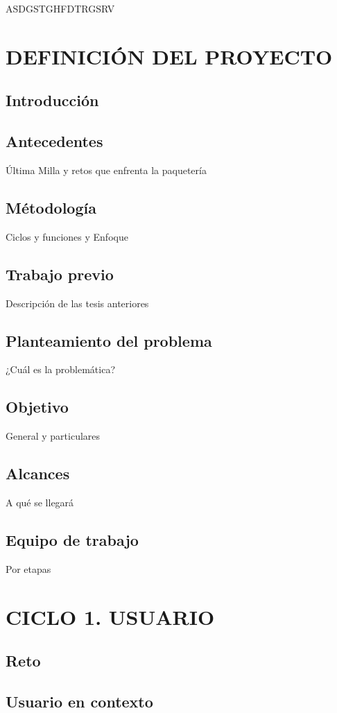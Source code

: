 \documentclass[12pt,letterpaper]{book}
\begin{document}
ASDGSTGHFDTRGSRV
\newpage

\renewcommand{\contentsname}{TABLA DE CONTENIDO}
\tableofcontents
\thispagestyle{empty}
\newpage

\setcounter{page}{1}
\chapter{DEFINICIÓN DEL PROYECTO}
\section{Introducción}
\section{Antecedentes}
Última Milla y retos que enfrenta la paquetería
\section{Métodología}
Ciclos y funciones y Enfoque
\section{Trabajo previo}
Descripción de las tesis anteriores
\section{Planteamiento del problema}
¿Cuál es la problemática?
\section{Objetivo}
General y particulares
\section{Alcances}
A qué se llegará
\section{Equipo de trabajo}
Por etapas
\newpage

\chapter{CICLO 1. USUARIO}
\section{Reto}
\section{Usuario en contexto}
\end{document}
